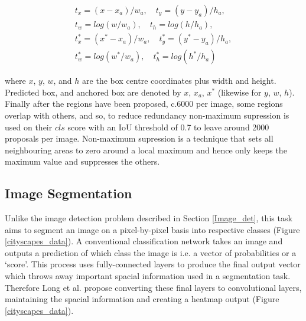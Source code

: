 \documentclass[11pt,twoside]{report}
\begin{document}
\begin{align*}
\label{bounding_box_loss}
t_{x} = (x-x_{a})/w_{a}, \quad t_{y} = (y-y_{a})/h_{a},\\
t_{w} = log(w/w_{a}), \quad t_{h} = log(h/h_{a}), \\
t_{x}^{*} = (x^{*}-x_{a})/w_{a},\quad t_{y}^{*} = (y^{*} - y_{a})/h_{a}, \\
t_{w}^{*} = log(w^{*}/w_{a}), \quad t_{h}^{*} = log(h^{*}/h_{a})
\end{align*}

where $x$, $y$, $w$, and $h$ are the box centre coordinates plus width and height. Predicted box, and anchored box are denoted by $x$, $x_{a}$, $x^{*}$ (likewise for $y$, $w$, $h$).
\newline \newline
Finally after the regions have been proposed, c.6000 per image, some regions overlap with others, and so, to reduce redundancy non-maximum supression is used on their $cls$ score with an IoU threshold of 0.7 to leave around 2000 proposals per image. Non-maximum supression is a technique that sets all neighbouring areas to zero around a local maximum and hence only keeps the maximum value and suppresses the others.

\subsection{Image Segmentation}\label{image_seg}
Unlike the image detection problem described in Section \ref{Image_det}, this task aims to segment an image on a pixel-by-pixel basis into respective classes (Figure \ref{cityscapes_data}). A conventional classification network takes an image and outputs a prediction of which class the image is i.e. a vector of probabilities or a `score'. This process uses fully-connected layers to produce the final output vector which throws away important spacial information used in a segmentation task. Therefore Long et al. \cite{DBLP:journals/corr/LongSD14} propose converting these final layers to convolutional layers, maintaining the spacial information and creating a heatmap output (Figure \ref{cityscapes_data}).
\end{document}
